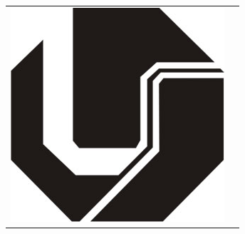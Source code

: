 \documentclass[xcolor=dvipsnames,10pt,aspectratio=169]{beamer}
\begin{document}
\begin{frame}
\begin{center}
\begin{tabular}{c c}
{				\includegraphics[trim=0.0cm 0.0cm 0.0cm 0.0cm,clip=true,height=0.2\textheight]{figuras_presentation_template/UFU_black.jpg}
			}
		\end{tabular}
		\end{center}

	\end{frame}
\end{document}
